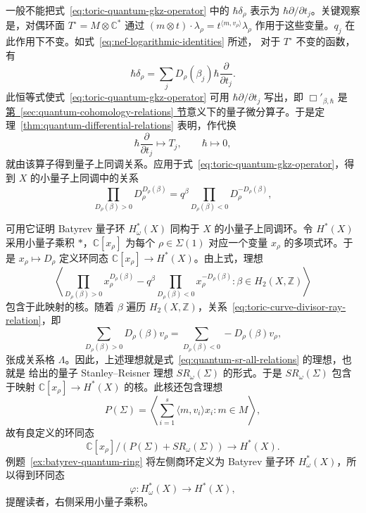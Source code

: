 \begin{example}
一般不能把式~\eqref{eq:toric-quantum-gkz-operator} 中的 $\hbar\delta_\rho$ 表示为 $\hbar\partial/\partial t_j$。关键观察是，对偶环面 $T^\circ=M\otimes\mathbb C^*$ 通过 $(m\otimes t)\cdot\lambda_\rho=t^{\langle m,v_\rho\rangle}\lambda_\rho$ 作用于这些变量。$q_j$ 在此作用下不变。如式~\eqref{eq:nef-logarithmic-identities} 所述，
对于 $T^\circ$ 不变的函数，有
\begin{equation}\label{eq:toric-quantum-gkz-coordinate-derivative}
\hbar\delta_\rho=\sum_j D_\rho(\beta_j)\hbar\frac\partial{\partial t_j}.
\end{equation}
此恒等式使式~\eqref{eq:toric-quantum-gkz-operator} 可用 $\hbar\partial/\partial t_j$ 写出，即 $\Box'_{\beta,\hbar}$ 是\hyperref[sec:quantum-cohomology-relations]{第~\ref*{sec:quantum-cohomology-relations} 节}意义下的量子微分算子。于是定理~\ref{thm:quantum-differential-relations} 表明，作代换
\[
\hbar\frac\partial{\partial t_j}\longmapsto T_j,\qquad\hbar\longmapsto0,
\]
就由该算子得到量子上同调关系。应用于式~\eqref{eq:toric-quantum-gkz-operator}，得到 $X$ 的小量子上同调中的关系
\begin{equation}\label{eq:toric-fano-quantum-stanley-reisner-relation}
\prod_{D_\rho(\beta)>0}D_\rho^{D_\rho(\beta)}
=q^\beta\prod_{D_\rho(\beta)<0}D_\rho^{-D_\rho(\beta)},
\end{equation}

可用它证明 Batyrev 量子环 $H_\omega^*(X)$ 同构于 $X$ 的小量子上同调环。令 $H^*(X)$ 采用小量子乘积 $*$，$\mathbb C[x_\rho]$ 为每个 $\rho\in\Sigma(1)$ 对应一个变量 $x_\rho$ 的多项式环。于是 $x_\rho\mapsto D_\rho$ 定义环同态 $\mathbb C[x_\rho]\to H^*(X)$。由上式，理想
\[
\left\langle\prod_{D_\rho(\beta)>0}x_\rho^{D_\rho(\beta)}
-q^\beta\prod_{D_\rho(\beta)<0}x_\rho^{-D_\rho(\beta)}:\beta\in H_2(X,\mathbb Z)\right\rangle
\]
包含于此映射的核。随着 $\beta$ 遍历 $H_2(X,\mathbb Z)$，关系~\eqref{eq:toric-curve-divisor-ray-relation}，即
\[
\sum_{D_\rho(\beta)>0}D_\rho(\beta)v_\rho
=\sum_{D_\rho(\beta)<0}-D_\rho(\beta)v_\rho,
\]
张成关系格 $\Lambda$。因此，上述理想就是式~\eqref{eq:quantum-sr-all-relations} 的理想，也就是  给出的量子 Stanley--Reisner 理想 $SR_\omega(\Sigma)$ 的形式。于是 $SR_\omega(\Sigma)$ 包含于映射 $\mathbb C[x_\rho]\to H^*(X)$ 的核。此核还包含理想
\[
P(\Sigma)=\left\langle\sum_{i=1}^s\langle m,v_i\rangle x_i:m\in M\right\rangle,
\]
故有良定义的环同态
\[
\mathbb C[x_\rho]/(P(\Sigma)+SR_\omega(\Sigma))\longrightarrow H^*(X).
\]
例题~\ref{ex:batyrev-quantum-ring} 将左侧商环定义为 Batyrev 量子环 $H_\omega^*(X)$，所以得到环同态
\[
\varphi:H_\omega^*(X)\longrightarrow H^*(X),
\]
提醒读者，右侧采用小量子乘积。


\end{example}
